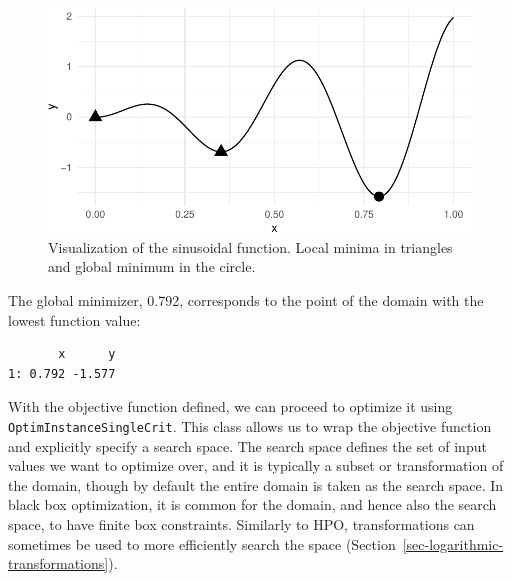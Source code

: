 \begin{figure}[H]

{\centering \includegraphics[width=1\textwidth,height=\textheight]{chapters/chapter5/advanced_tuning_methods_and_black_box_optimization_files/figure-pdf/fig-bayesian-optimization-sinusoidal-1.pdf}

}

\caption{\label{fig-bayesian-optimization-sinusoidal}Visualization of
the sinusoidal function. Local minima in triangles and global minimum in
the circle.}

\end{figure}

The global minimizer, 0.792, corresponds to the point of the domain with
the lowest function value:

\begin{Shaded}
\begin{Highlighting}[]
\NormalTok{xydt[y }\SpecialCharTok{==} \NormalTok{(y), ]}
\end{Highlighting}
\end{Shaded}

\begin{verbatim}
       x      y
1: 0.792 -1.577
\end{verbatim}

With the objective function defined, we can proceed to optimize it using
\texttt{OptimInstanceSingleCrit}. This class allows us to wrap the
objective function and explicitly specify a search space. The search
space defines the set of input values we want to optimize over, and it
is typically a subset or transformation of the domain, though by default
the entire domain is taken as the search space. In black box
optimization, it is common for the domain, and hence also the search
space, to have finite box constraints. Similarly to HPO, transformations
can sometimes be used to more efficiently search the space
(Section~\ref{sec-logarithmic-transformations}).


